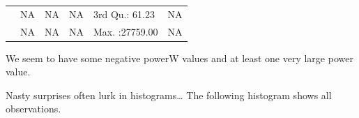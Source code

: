 \documentclass[]{article}
\begin{document}
\begin{longtable}[]{@{}llllll@{}}
\begin{minipage}[t]{0.04\columnwidth}\raggedright\strut
\strut
\end{minipage} & \begin{minipage}[t]{0.16\columnwidth}\raggedright\strut
NA\strut
\end{minipage} & \begin{minipage}[t]{0.16\columnwidth}\raggedright\strut
NA\strut
\end{minipage} & \begin{minipage}[t]{0.16\columnwidth}\raggedright\strut
NA\strut
\end{minipage} & \begin{minipage}[t]{0.16\columnwidth}\raggedright\strut
3rd Qu.: 61.23\strut
\end{minipage} & \begin{minipage}[t]{0.16\columnwidth}\raggedright\strut
NA\strut
\end{minipage}\tabularnewline
\begin{minipage}[t]{0.04\columnwidth}\raggedright\strut
\strut
\end{minipage} & \begin{minipage}[t]{0.16\columnwidth}\raggedright\strut
NA\strut
\end{minipage} & \begin{minipage}[t]{0.16\columnwidth}\raggedright\strut
NA\strut
\end{minipage} & \begin{minipage}[t]{0.16\columnwidth}\raggedright\strut
NA\strut
\end{minipage} & \begin{minipage}[t]{0.16\columnwidth}\raggedright\strut
Max. :27759.00\strut
\end{minipage} & \begin{minipage}[t]{0.16\columnwidth}\raggedright\strut
NA\strut
\end{minipage}\tabularnewline
\bottomrule
\end{longtable}

We seem to have some negative powerW values and at least one very large
power value.

Nasty surprises often lurk in histograms\ldots{} The following histogram
shows all observations.
\end{document}
